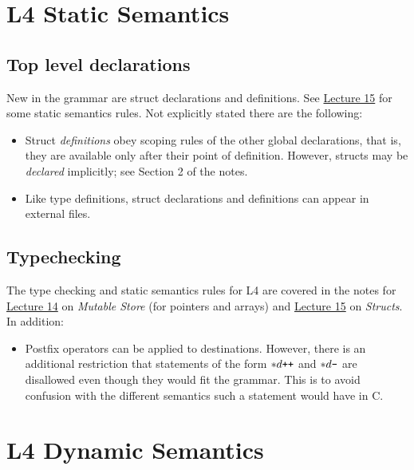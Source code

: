 \documentclass[11pt]{article}
\begin{document}
\section{L4 Static Semantics}

\subsection*{Top level declarations}

New in the grammar are struct declarations and definitions.  See
\href{http://www.cs.cmu.edu/~fp/courses/15411-f13/lectures/15-structs.pdf}{Lecture
  15} for some static semantics rules.  Not explicitly stated
there are the following:
\begin {itemize}
\item Struct \emph{definitions} obey scoping rules of the other global
  declarations, that is, they are available only after their point of
  definition.  However, structs may be \emph{declared} implicitly; see
  Section 2 of the notes.
\item Like type definitions, struct declarations and definitions can
  appear in external files.
\end {itemize}

\subsection*{Typechecking}

The type checking and static semantics rules for L4 are covered in the
notes for
\href{http://www.cs.cmu.edu/~fp/courses/15411-f13/lectures/14-mutable.pdf}{Lecture
  14} on \emph{Mutable Store} (for pointers and arrays) and
\href{http://www.cs.cmu.edu/~fp/courses/15411-f13/lectures/15-structs.pdf}{Lecture
  15} on \emph{Structs}. In addition:

\begin {itemize}
\item Postfix operators can be applied to destinations. However, there
  is an additional restriction that statements of the form
  ${*}d{\mbox{\tt ++}}$ and ${*}d{\mbox{\tt --}}$ are disallowed even
  though they would fit the grammar.  This is to avoid confusion with
  the different semantics such a statement would have in C.
\end {itemize}

\section{L4 Dynamic Semantics}
\end{document}
